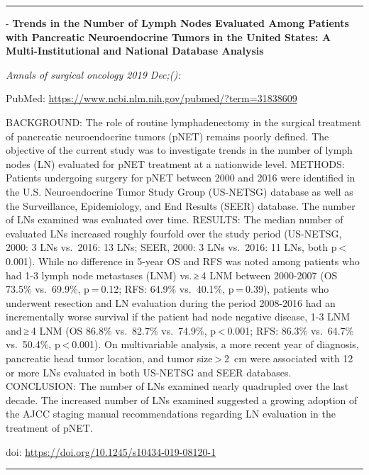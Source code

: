 \documentclass[
]{article}
\renewcommand{\linethickness}{0.05em}
\begin{document}
\begin{center}\rule{0.5\linewidth}{\linethickness}\end{center}

- \textbf{Trends in the Number of Lymph Nodes Evaluated Among Patients
with Pancreatic Neuroendocrine Tumors in the United States: A
Multi-Institutional and National Database Analysis}

\emph{Annals of surgical oncology 2019 Dec;():}

PubMed: \url{https://www.ncbi.nlm.nih.gov/pubmed/?term=31838609}

BACKGROUND: The role of routine lymphadenectomy in the surgical
treatment of pancreatic neuroendocrine tumors (pNET) remains poorly
defined. The objective of the current study was to investigate trends in
the number of lymph nodes (LN) evaluated for pNET treatment at a
nationwide level. METHODS: Patients undergoing surgery for pNET between
2000 and 2016 were identified in the U.S. Neuroendocrine Tumor Study
Group (US-NETSG) database as well as the Surveillance, Epidemiology, and
End Results (SEER) database. The number of LNs examined was evaluated
over time. RESULTS: The median number of evaluated LNs increased roughly
fourfold over the study period (US-NETSG, 2000: 3 LNs vs.~2016: 13 LNs;
SEER, 2000: 3 LNs vs.~2016: 11 LNs, both p \textless{} 0.001). While no
difference in 5-year OS and RFS was noted among patients who had 1-3
lymph node metastases (LNM) vs. ≥ 4 LNM between 2000-2007 (OS 73.5\%
vs.~69.9\%, p = 0.12; RFS: 64.9\% vs.~40.1\%, p = 0.39), patients who
underwent resection and LN evaluation during the period 2008-2016 had an
incrementally worse survival if the patient had node negative disease,
1-3 LNM and ≥ 4 LNM (OS 86.8\% vs.~82.7\% vs.~74.9\%,
p \textless{} 0.001; RFS: 86.3\% vs.~64.7\% vs.~50.4\%,
p \textless{} 0.001). On multivariable analysis, a more recent year of
diagnosis, pancreatic head tumor location, and tumor
size \textgreater{} 2~cm were associated with 12 or more LNs evaluated
in both US-NETSG and SEER databases. CONCLUSION: The number of LNs
examined nearly quadrupled over the last decade. The increased number of
LNs examined suggested a growing adoption of the AJCC staging manual
recommendations regarding LN evaluation in the treatment of pNET.

doi: \url{https://doi.org/10.1245/s10434-019-08120-1}

\begin{center}\rule{0.5\linewidth}{\linethickness}\end{center}
\end{document}
